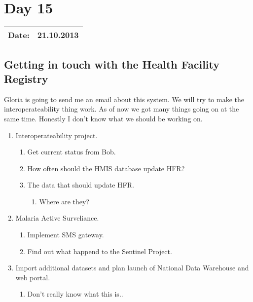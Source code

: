 \section{Day 15}
\begin{tabular}{|c|c|}
\hline
Date: & 21.10.2013 \\
\hline
\end{tabular}
\subsection{Getting in touch with the Health Facility Registry}
Gloria is going to send me an email about this system. We will try to make the interoperateability thing work.
As of now we got many things going on at the same time. Honestly I don't know what we should be working on.
\begin{enumerate}
\item Interoperateability project.
	\begin{enumerate}
		\item Get current status from Bob.
		\item How often should the HMIS database update HFR?
		\item The data that should update HFR.
			\begin{enumerate}
				\item Where are they?
			\end{enumerate}
	\end{enumerate}
\item Malaria Active Surveliance.
	\begin{enumerate}
		\item Implement SMS gateway.
		\item Find out what happend to the Sentinel Project.
	\end{enumerate}
\item Import additional datasets and plan launch of National Data Warehouse and web portal.
	\begin{enumerate}
		\item Don't really know what this is..
	\end{enumerate}
\end{enumerate}
